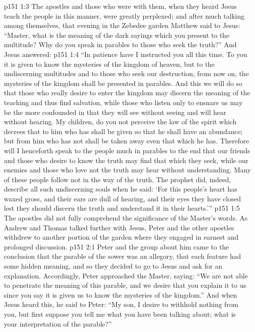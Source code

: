 \pc \vs p151 1:3 The apostles and those who were with them, when they heard Jesus teach the people in this manner, were greatly perplexed; and after much talking among themselves, that evening in the Zebedee garden Matthew said to Jesus: “Master, what is the meaning of the dark sayings which you present to the multitude? Why do you speak in parables to those who seek the truth?” And Jesus answered:
\vs p151 1:4 \textcolor{ubdarkred}{“In patience have I instructed you all this time. To you it is given to know the mysteries of the kingdom of heaven, but to the undiscerning multitudes and to those who seek our destruction, from now on, the mysteries of the kingdom shall be presented in parables. And this we will do so that those who really desire to enter the kingdom may discern the meaning of the teaching and thus find salvation, while those who listen only to ensnare us may be the more confounded in that they will see without seeing and will hear without hearing. My children, do you not perceive the law of the spirit which decrees that to him who has shall be given so that he shall have an abundance; but from him who has not shall be taken away even that which he has. Therefore will I henceforth speak to the people much in parables to the end that our friends and those who desire to know the truth may find that which they seek, while our enemies and those who love not the truth may hear without understanding. Many of these people follow not in the way of the truth. The prophet did, indeed, describe all such undiscerning souls when he said: ‘For this people’s heart has waxed gross, and their ears are dull of hearing, and their eyes they have closed lest they should discern the truth and understand it in their hearts.’”}
\vs p151 1:5 The apostles did not fully comprehend the significance of the Master’s words. As Andrew and Thomas talked further with Jesus, Peter and the other apostles withdrew to another portion of the garden where they engaged in earnest and prolonged discussion.
\vs p151 2:1 Peter and the group about him came to the conclusion that the parable of the sower was an allegory, that each feature had some hidden meaning, and so they decided to go to Jesus and ask for an explanation. Accordingly, Peter approached the Master, saying: “We are not able to penetrate the meaning of this parable, and we desire that you explain it to us since you say it is given us to know the mysteries of the kingdom.” And when Jesus heard this, he said to Peter: \textcolor{ubdarkred}{“My son, I desire to withhold nothing from you, but first suppose you tell me what you have been talking about; what is your interpretation of the parable?”}
